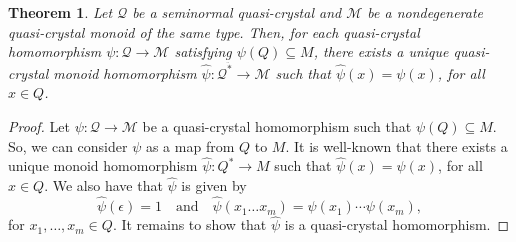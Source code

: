 \documentclass[a4paper,reqno]{amsart}
\numberwithin{equation}{section}
\theoremstyle{plain}
\newtheorem{thm}{Theorem}[section]
\theoremstyle{definition}
\theoremstyle{remark}
\newcommand*{\ew}{\epsilon}                     %
\newcommand*{\qcrst}[1]{\mathcal{#1}}
\newcommand*{\qcrstQ}{\qcrst{Q}}
\newcommand*{\qcmon}[1]{\qcrst{#1}}
\newcommand*{\qcrstM}{\qcmon{M}}
\newcommand*{\fqcms}{{\ddot{*}}}      %
\begin{document}
\begin{thm}
\label{thm:fqcmext}
Let $\qcrstQ$ be a seminormal quasi-crystal and $\qcrstM$ be a nondegenerate quasi-crystal monoid of the same type.
Then, for each quasi-crystal homomorphism $\psi : \qcrstQ \to \qcrstM$ satisfying $\psi (Q) \subseteq M$, there exists a unique quasi-crystal monoid homomorphism $\hat{\psi} : \qcrstQ^\fqcms \to \qcrstM$ such that $\hat{\psi} (x) = \psi (x)$, for all $x \in Q$.
\end{thm}

\begin{proof}
Let $\psi : \qcrstQ \to \qcrstM$ be a quasi-crystal homomorphism such that $\psi(Q) \subseteq M$.
So, we can consider $\psi$ as a map from $Q$ to $M$.
It is well-known that there exists a unique monoid homomorphism $\hat{\psi} : Q^* \to M$ such that $\hat{\psi} (x) = \psi (x)$, for all $x \in Q$.
We also have that $\hat{\psi}$ is given by
\[
\hat{\psi} (\ew) = 1
\quad \text{and} \quad
\hat{\psi} (x_1 \ldots x_m) = \psi (x_1) \cdots \psi (x_m),
\]
for $x_1, \ldots, x_m \in Q$.
It remains to show that $\hat{\psi}$ is a quasi-crystal homomorphism.


\end{proof}
\end{document}
